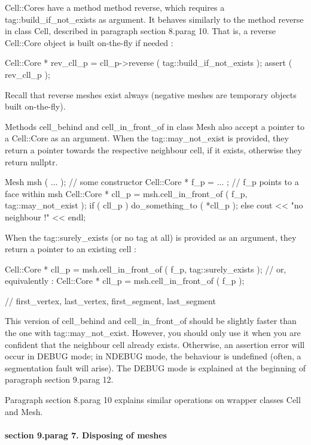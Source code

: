 {\codett Cell::Core}s have a method method {\codett reverse}, which requires a
{\codett tag::build\_if\_not\_exists} as argument.
It behaves similarly to the method {\codett reverse} in class {\codett Cell},
described in paragraph \numb section 8.\numb parag 10.
That is, a reverse {\codett Cell::Core} object is built on-the-fly if needed :

\verbatim
   Cell::Core * rev_cll_p = cll_p->reverse ( tag::build_if_not_exists );
   assert ( rev_cll_p );
\endverbatim

Recall that reverse meshes exist always (negative meshes are temporary objects built
on-the-fly).

Methods {\codett cell\_behind} and {\codett cell\_in\_front\_of} in class {\codett Mesh}
also accept a pointer to a {\codett Cell::Core} as an argument.
When the {\codett tag::may\_not\_exist} is provided,
they return a pointer towards the respective neighbour cell, if it exists, otherwise
they return {\codett nullptr}.

\verbatim
   Mesh msh ( ... );  // some constructor
   Cell::Core * f_p = ... ;  //  f_p points to a face within msh
   Cell::Core * cll_p = msh.cell_in_front_of ( f_p, tag::may_not_exist );
   if ( cll_p ) do_something_to ( *cll_p );
   else cout << "no neighbour !" << endl;
\endverbatim

When the {\codett tag::surely\_exists} (or no tag at all) is provided as an argument,
they return a pointer to an existing cell :

\verbatim
   Cell::Core * cll_p = msh.cell_in_front_of ( f_p, tag::surely_exists );
   // or, equivalently :
   Cell::Core * cll_p = msh.cell_in_front_of ( f_p );

   // first_vertex, last_vertex, first_segment, last_segment
\endverbatim

This version of {\codett cell\_behind} and {\codett cell\_in\_front\_of} should be
slightly faster than the one with {\codett tag::may\_not\_exist}.
However, you should only use it when you are confident that the neighbour cell already
exists.
Otherwise, an {\codett assertion error} will occur in {\codett DEBUG} mode;
in {\codett NDEBUG} mode, the behaviour is undefined (often, a {\codett segmentation fault}
will arise).
The {\codett DEBUG} mode is explained at the beginning of paragraph \numb section
9.\numb parag 12.

Paragraph \numb section 8.\numb parag 10 explains similar operations on wrapper classes
{\codett Cell} and {\codett Mesh}.


\paragraph{\numb section 9.\numb parag 7. Disposing of meshes}


